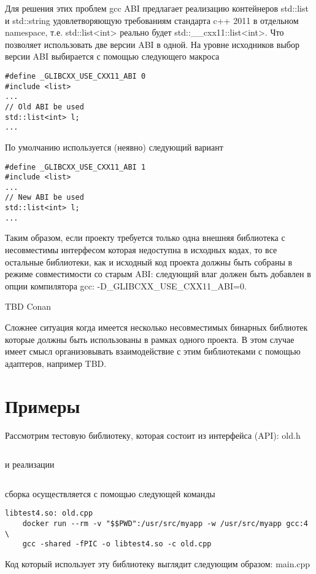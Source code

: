 \documentclass[14pt,a4paper]{article}
\begin{document}
Для решения этих проблем gcc ABI предлагает реализацию контейнеров
std::list и std::string
удовлетворяющую требованиям стандарта c++ 2011 
 в отдельном namespace, т.е. std::list<int> реально будет 
std::\_\_cxx11::list<int>. Что позволяет использовать две версии ABI в
одной. На уровне исходников выбор версии ABI выбирается с помощью
следующего макроса
\begin{verbatim}
#define _GLIBCXX_USE_CXX11_ABI 0
#include <list>
...
// Old ABI be used
std::list<int> l;
...
\end{verbatim} 

По умолчанию используется (неявно) следующий вариант
\begin{verbatim}
#define _GLIBCXX_USE_CXX11_ABI 1
#include <list>
...
// New ABI be used
std::list<int> l;
...
\end{verbatim} 

Таким образом, если проекту требуется только одна внешняя библиотека с
несовместимы интерфесом которая недоступна в исходных кодах, то все
остальные библиотеки, как и исходный код проекта должны быть собраны в
режиме совместимости со старым ABI: следующий влаг должен быть
добавлен в опции компилятора gcc:
-D\_GLIBCXX\_USE\_CXX11\_ABI=0. 

TBD Conan

Сложнее ситуация когда имеется несколько несовместимых бинарных
библиотек которые должны быть использованы в рамках одного проекта.
В этом случае имеет смысл организовывать взаимодействие с этим
библиотеками с помощью адаптеров, например TBD.

\section{Примеры}

Рассмотрим тестовую библиотеку, которая состоит из интерфейса (API):
old.h
\inputminted{c++}{./src/old.h}
и реализации 
\inputminted{c++}{./src/old.cpp}
сборка осуществляется с помощью следующей команды
\begin{verbatim}
libtest4.so: old.cpp
	docker run --rm -v "$$PWD":/usr/src/myapp -w /usr/src/myapp gcc:4 \
	gcc -shared -fPIC -o libtest4.so -c old.cpp
\end{verbatim}

Код который использует эту библиотеку выглядит следующим образом: main.cpp
\inputminted{c++}{./src/main.cpp}
\end{document}
